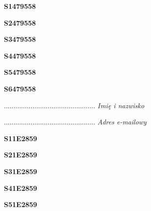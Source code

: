 \begin{turn}{90}\huge \textbf{S1479558}\end{turn}

\begin{turn}{90}\huge \textbf{S2479558}\end{turn}

\begin{turn}{90}\huge \textbf{S3479558}\end{turn}

\begin{turn}{90}\huge \textbf{S4479558}\end{turn}

\begin{turn}{90}\huge \textbf{S5479558}\end{turn}

\begin{turn}{90}\huge \textbf{S6479558}\end{turn}

\begin{turn}{90}\begin{minipage}{\linewidth} \vspace{20mm} ................................................  \textit{Imię i nazwisko}\end{minipage}\end{turn}

\begin{turn}{90}\begin{minipage}{\linewidth} \vspace{20mm} ................................................  \textit{Adres e-mailowy}\end{minipage}\end{turn}

\begin{turn}{90}\huge \textbf{S11E2859}\end{turn}

\begin{turn}{90}\huge \textbf{S21E2859}\end{turn}

\begin{turn}{90}\huge \textbf{S31E2859}\end{turn}

\begin{turn}{90}\huge \textbf{S41E2859}\end{turn}

\begin{turn}{90}\huge \textbf{S51E2859}\end{turn}

